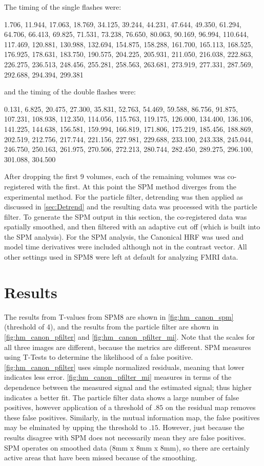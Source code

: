 The timing of the single flashes were:

1.706, 11.944, 17.063, 18.769, 34.125, 39.244, 44.231, 47.644, 49.350, 
61.294, 64.706, 66.413, 69.825, 71.531, 73.238, 76.650, 80.063, 
90.169, 96.994, 110.644, 117.469, 120.881, 130.988, 132.694, 154.875, 
158.288, 161.700, 165.113, 168.525, 176.925, 178.631, 183.750, 190.575, 
204.225, 205.931, 211.050, 216.038, 222.863, 226.275, 236.513, 248.456, 
255.281, 258.563, 263.681, 273.919, 277.331, 287.569, 292.688, 294.394, 
299.381

and the timing of the double flashes were:

0.131, 6.825, 20.475, 27.300, 35.831, 52.763, 54.469, 59.588, 86.756, 
91.875, 107.231, 108.938, 112.350, 114.056, 115.763, 119.175, 126.000, 
134.400, 136.106, 141.225, 144.638, 156.581, 159.994, 166.819, 171.806, 
175.219, 185.456, 188.869, 202.519, 212.756, 217.744, 221.156, 227.981, 
229.688, 233.100, 243.338, 245.044, 246.750, 250.163, 261.975, 270.506, 
272.213, 280.744, 282.450, 289.275, 296.100, 301.088, 304.500

After dropping the first 9 volumes, each of the remaining volumes was
co-registered with the first. At this point the SPM method
diverges from the experimental method. For the particle filter, detrending 
was then applied as discussed in \autoref{sec:Detrend} and the resulting
data was processed with the particle filter. To generate the SPM output
in this section, the co-registered data was spatially smoothed,
and then filtered with an adaptive cut off (which is built into the
SPM analysis). For the SPM analysis, the Canonical HRF was used
and model time derivatives were included although not in the contrast
vector. All other settings used in SPM8 were left at default
for analyzing FMRI data.

\section{Results}
The results from T-values from SPM8 are shown in \autoref{fig:hm_canon_spm} (threshold of
4), and the results from 
the particle filter are shown in \autoref{fig:hm_canon_pfilter} and \autoref{fig:hm_canon_pfilter_mi}.
Note that the scales for all three images are different, because the metrics are different.
SPM measures using T-Tests to determine the likelihood of a false positive. \autoref{fig:hm_canon_pfilter}
uses simple normalized residuals, meaning that lower indicates less error.  
\autoref{fig:hm_canon_pfilter_mi} measures in terms of the dependence between the 
measured signal and the estimated signal; thus higher indicates a better fit. The particle
filter data shows a large number of false positives, however application of a threshold
of $.85$ on the residual map removes these false positives. Similarly, in the mutual information
map, the false positives may be elminated by upping the threshold to $.15$. However, just
because the results disagree with SPM does not necessarily mean they are false positives.
SPM operates on smoothed data (8mm x 8mm x 8mm), so there are certainly active 
areas that have been missed because of the smoothing. 

